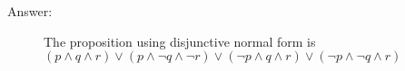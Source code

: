 \documentclass[12pt, oneside]{article}
\begin{document}
\begin{enumerate}
\begin{center}
\begin{tabular}{|c|c|c|c|c|}
\end{tabular}
\end{center}

\begin{description}
    \item[Answer:] The proposition using disjunctive normal form is $(p \wedge q \wedge r) \vee (p \wedge \lnot q \wedge \lnot r) \lor (\lnot p \land q \land r) \lor (\lnot p \land \lnot q \land r)$
\end{description}

\end{enumerate}
\end{document}
